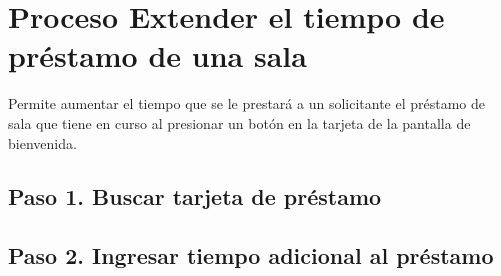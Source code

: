 \chapter{Proceso Extender el tiempo de préstamo de una sala}

Permite aumentar el tiempo que se le prestará a un solicitante
el préstamo de sala que tiene en curso al presionar un botón en
la tarjeta de la pantalla de bienvenida.


\section{Paso 1. Buscar tarjeta de préstamo}
    

\section{Paso 2. Ingresar tiempo adicional al préstamo}
    
		